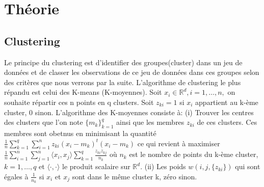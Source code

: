 \chapter*{Théorie}
\newcommand\tab[1][0.8cm]{\hspace*{#1}}

\section{Clustering}

\begin{article}

Le principe du clustering est d'identifier des groupes(cluster) dans un jeu de données et de classer les observations
de ce jeu de données dans ces groupes selon des critères que nous verrons par la suite.
\newline L'algorithme de clustering le plus répandu est celui des K-means (K-moyennes). Soit $x_i \in \mathbb{R}^d,
i = 1,\dots,n,$ on souhaite répartir ces n points en q clusters. Soit $z_{ki} = 1$ si $x_i$ appartient au k-ème cluster, 0
sinon.
\newline
\newline L'algorithme des K-moyennes consiste à:
\newline
\newline (i) Trouver les centres des clusters que l'on note $\{m_k\}_{k=1}^{q}$ ainsi que les membres $z_{ki}$ de ces
clusters. Ces membres sont obetnus en minimisant la quantité $\frac{1}{n}\sum_{k=1}^{q}\sum_{i=1}^{n}z_{ki}(x_i-m_k)^t(x_i-m_k)$
ce qui revient à maximiser $\frac{1}{n}\sum_{i=1}^{n}\sum_{j=1}^{n}\langle x_i,x_j \rangle\sum_{k=1}^{q}\frac{z_{ki}z_{kj}}{n_k} $
où $n_k$ est le nombre de points du k-ème cluster, $k=1,\dots,q$ et $\langle \cdot,\cdot \rangle$ le produit scalaire sur $\mathbb{R}^d$.
\newline
\newline (ii) Les poids $w(i,j,\{z_{ki}\})$ qui sont égales à $\frac{1}{n_k}$ si $x_i$ et $x_j$ sont dans le même cluster k,
zéro sinon.



\end{article}